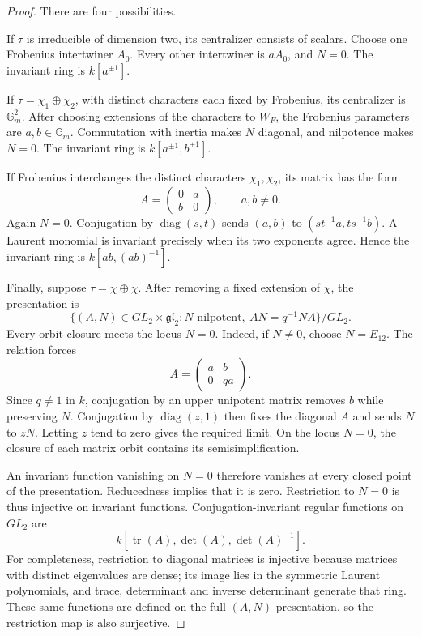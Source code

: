 \begin{proof}
There are four possibilities.

If \(\tau\) is irreducible of dimension two, its
centralizer consists of scalars. Choose one Frobenius
intertwiner \(A_0\). Every other intertwiner is \(aA_0\),
and \(N=0\). The invariant ring is \(k[a^{\pm1}]\).

If \(\tau=\chi_1\oplus\chi_2\), with distinct characters
each fixed by Frobenius, its centralizer is
\(\mathbb G_m^2\). After choosing extensions of the
characters to \(W_F\), the Frobenius parameters are
\(a,b\in\mathbb G_m\). Commutation with inertia makes
\(N\) diagonal, and nilpotence makes \(N=0\). The
invariant ring is \(k[a^{\pm1},b^{\pm1}]\).

If Frobenius interchanges the distinct characters
\(\chi_1,\chi_2\), its matrix has the form
\[
 A=\begin{pmatrix}0&a\\ b&0\end{pmatrix},
 \qquad a,b\neq0.
\]
Again \(N=0\). Conjugation by
\(\operatorname{diag}(s,t)\) sends
\((a,b)\) to \((st^{-1}a,ts^{-1}b)\).
A Laurent monomial is invariant precisely when its two
exponents agree. Hence the invariant ring is
\(k[ab,(ab)^{-1}]\).

Finally, suppose \(\tau=\chi\oplus\chi\). After removing
a fixed extension of \(\chi\), the presentation is
\[
 \{(A,N)\in GL_2\times\mathfrak{gl}_2:
       N\text{ nilpotent},\ AN=q^{-1}NA\}/GL_2.
\]
Every orbit closure meets the locus \(N=0\).
Indeed, if \(N\neq0\), choose \(N=E_{12}\). The relation
forces
\[
 A=\begin{pmatrix}a&b\\0&qa\end{pmatrix}.
\]
Since \(q\neq1\) in \(k\), conjugation by an upper
unipotent matrix removes \(b\) while preserving \(N\).
Conjugation by \(\operatorname{diag}(z,1)\) then fixes
the diagonal \(A\) and sends \(N\) to \(zN\).
Letting \(z\) tend to zero gives the required limit.
On the locus \(N=0\), the closure of each matrix orbit
contains its semisimplification.

An invariant function vanishing on \(N=0\) therefore
vanishes at every closed point of the presentation.
Reducedness implies that it is zero. Restriction to
\(N=0\) is thus injective on invariant functions.
Conjugation-invariant regular functions on \(GL_2\)
are
\[
 k[\operatorname{tr}(A),\det(A),\det(A)^{-1}].
\]
For completeness, restriction to diagonal matrices is
injective because matrices with distinct eigenvalues
are dense; its image lies in the symmetric Laurent
polynomials, and trace, determinant and inverse
determinant generate that ring. These same functions
are defined on the full \((A,N)\)-presentation, so the
restriction map is also surjective.


\end{proof}
